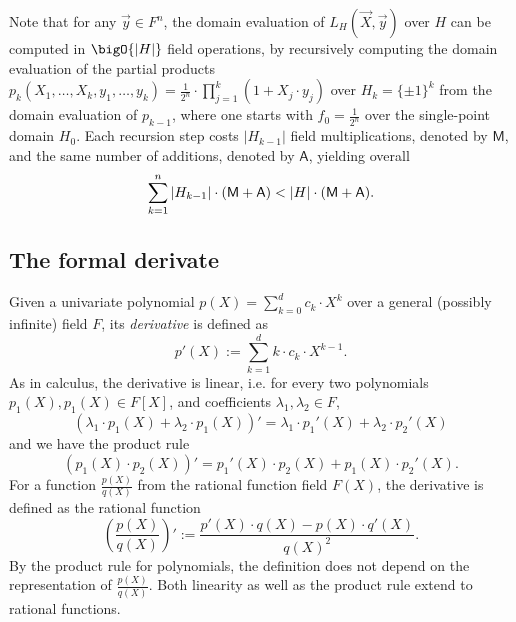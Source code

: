 \documentclass[11pt]{article}
\theoremstyle{definition}
\theoremstyle{definition}
\begin{document}
Note that for any $\vec y\in F^n$, the domain evaluation of $L_H(\vec X, \vec y)$ over $H$ can be computed in 
$\bigO{|H|}$ field operations, by recursively computing the domain evaluation of the partial products 
$
p_k(X_1,\ldots, X_k, y_1,\ldots, y_k)= \frac{1}{2^n}\cdot \prod_{j=1}^k (1 + X_j\cdot y_j)
$ 
over $H_k =\{\pm 1\}^k$ from the domain evaluation of $p_{k-1}$, where one starts with $f_0 = \frac{1}{2^n}$ over the single-point domain $H_0$.
Each recursion step costs $|H_{k-1}|$ field multiplications, denoted by $\mathsf M$, and the same number of additions, denoted by $\mathsf A$,  yielding overall
\begin{equation}
\label{e:lagrange:cost}
\sum_{k=1}^{n} |H_{k-1}| \cdot (\textsf M + \textsf A) < |H| \cdot  (\textsf M + \textsf A).
\end{equation}


\subsection{The formal derivate}

Given a univariate polynomial $p(X) =\sum_{k=0}^{d} c_k\cdot X^k$ over a general (possibly infinite) field $F$, its \textit{derivative} is defined as 
\begin{equation}
\label{e:DerivativePoly}
p'(X) := \sum_{k=1}^{d} k \cdot c_k \cdot X^{k-1}.
\end{equation}
As in calculus, the derivative is linear, i.e. for every two polynomials $p_1(X), p_1(X)\in F[X]$, and coefficients $\lambda_1,\lambda_2\in F$,
\begin{equation*}
(\lambda_1 \cdot p_1(X) + \lambda_2 \cdot p_1(X))' = \lambda_1\cdot p_1'(X) + \lambda_2\cdot p_2'(X)
\end{equation*}
 and we have the product rule
\begin{equation*}
(p_1(X)\cdot p_2(X))' = p_1'(X)\cdot p_2(X) + p_1(X)\cdot p_2'(X).
\end{equation*}
For a function $\frac{p(X)}{q(X)}$ from the rational function field $F(X)$, the derivative is defined as the rational function
\begin{equation}
\label{e:DerivativeQuotient}
\left(\frac{p(X)}{q(X)}\right)' := \frac{p'(X)\cdot q(X) - p(X)\cdot q'(X)}{q(X)^2}.
\end{equation}
By the product rule for polynomials, the definition does not depend on the representation of $\frac{p(X)}{q(X)}$.
Both linearity as well as the product rule extend to rational functions. 
\end{document}
